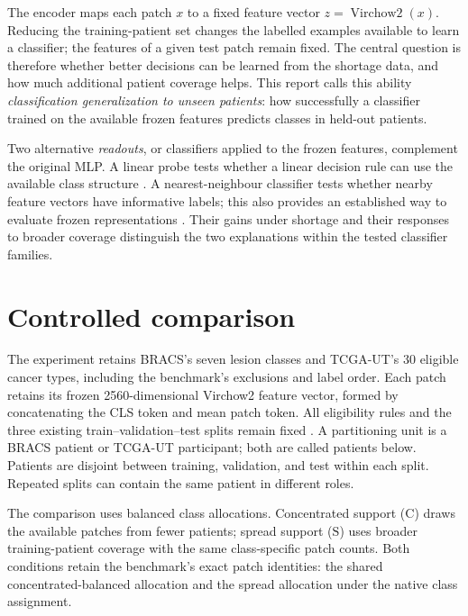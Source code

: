 \documentclass[11pt]{article}
\newcommand{\conc}{\mathrm{C}}
\newcommand{\spr}{\mathrm{S}}
\begin{document}
The encoder maps each patch \(x\) to a fixed feature vector \(z=\operatorname{Virchow2}(x)\). Reducing the training-patient set changes the labelled examples available to learn a classifier; the features of a given test patch remain fixed. The central question is therefore whether better decisions can be learned from the shortage data, and how much additional patient coverage helps. This report calls this ability \emph{classification generalization to unseen patients}: how successfully a classifier trained on the available frozen features predicts classes in held-out patients.

Two alternative \emph{readouts}, or classifiers applied to the frozen features, complement the original MLP. A linear probe tests whether a linear decision rule can use the available class structure \citep{alain2016probes}. A nearest-neighbour classifier tests whether nearby feature vectors have informative labels; this also provides an established way to evaluate frozen representations \citep{caron2021emerging}. Their gains under shortage and their responses to broader coverage distinguish the two explanations within the tested classifier families.
\section{Controlled comparison}
\label{sec:design}
The experiment retains BRACS's seven lesion classes and TCGA-UT's 30 eligible cancer types, including the benchmark's exclusions and label order. Each patch retains its frozen 2560-dimensional Virchow2 feature vector, formed by concatenating the CLS token and mean patch token. All eligibility rules and the three existing train--validation--test splits remain fixed \citep{queisler2026benchmarkProtocol}. A partitioning unit is a BRACS patient or TCGA-UT participant; both are called patients below. Patients are disjoint between training, validation, and test within each split. Repeated splits can contain the same patient in different roles.

The comparison uses balanced class allocations. Concentrated support (\(\conc\)) draws the available patches from fewer patients; spread support (\(\spr\)) uses broader training-patient coverage with the same class-specific patch counts. Both conditions retain the benchmark's exact patch identities: the shared concentrated-balanced allocation and the spread allocation under the native class assignment.
\end{document}
